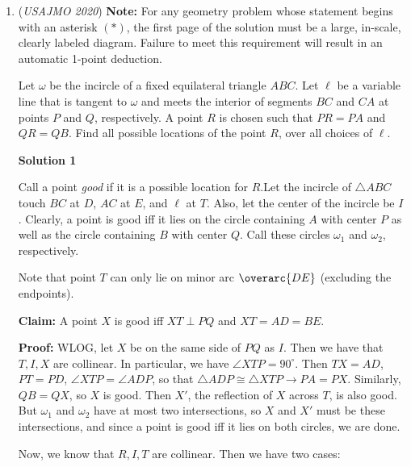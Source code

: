\begin{enumerate}
 From the claim, the ith book must be shorter than the $(i+1)$th book. But since the ith book is also wider by definition (as $f(i)>f(i+1)$), Carl can swap those two books, so he still has legal moves and we arrive at a contradiction, so we are done. $\blacksquare$



	\item (\textit{USAJMO 2020}) \textbf{Note:} For any geometry problem whose statement begins with an asterisk $(*)$, the first page of the solution must be a large, in-scale, clearly labeled diagram. Failure to meet this requirement will result in an automatic 1-point deduction.


 Let $\omega$ be the incircle of a fixed equilateral triangle $ABC$. Let $\ell$ be a variable line that is tangent to $\omega$ and meets the interior of segments $BC$ and $CA$ at points $P$ and $Q$, respectively. A point $R$ is chosen such that $PR = PA$ and $QR = QB$. Find all possible locations of the point $R$, over all choices of $\ell$.


 



\textbf{Solution 1}

Call a point \textit{good} if it is a possible location for $R$.Let the incircle of $\triangle ABC$ touch $BC$ at $D$, $AC$ at $E$, and $\ell$ at $T$. Also, let the center of the incircle be $I$. Clearly, a point is good iff it lies on the circle containing $A$ with center $P$ as well as the circle containing $B$ with center $Q$. Call these circles $\omega_1$ and $\omega_2$, respectively.

 Note that point $T$ can only lie on minor arc $\overarc{DE}$ (excluding the endpoints). 

 \textbf{Claim:} A point $X$ is good iff $XT\perp PQ$ and $XT=AD=BE$.

 \textbf{Proof:} WLOG, let $X$ be on the same side of $PQ$ as $I$. Then we have that $T, I, X$ are collinear. In particular, we have $\angle XTP=90^{\circ}$. Then $TX=AD$, $PT=PD$, $\angle XTP=\angle ADP$, so that $\triangle ADP\cong \triangle XTP\rightarrow PA=PX$. Similarly, $QB=QX$, so $X$ is good. Then $X'$, the reflection of $X$ across $T$, is also good. But $\omega_1$ and $\omega_2$ have at most two intersections, so $X$ and $X'$ must be these intersections, and since a point is good iff it lies on both circles, we are done.

 Now, we know that $R, I, T$ are collinear. Then we have two cases:


\end{enumerate}
